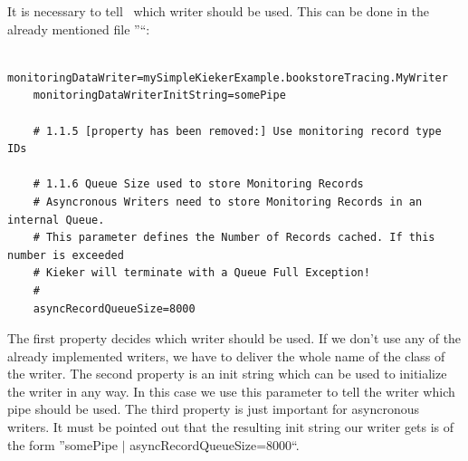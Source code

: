       It is necessary to tell \KiekerMonitoring\ which writer should be used. This can be done in the already mentioned file ''\monitoringPropertiesFile``:
      \setBashListing
      \begin{lstlisting}
	monitoringDataWriter=mySimpleKiekerExample.bookstoreTracing.MyWriter
	monitoringDataWriterInitString=somePipe

	# 1.1.5 [property has been removed:] Use monitoring record type IDs

	# 1.1.6 Queue Size used to store Monitoring Records
	# Asyncronous Writers need to store Monitoring Records in an internal Queue.
	# This parameter defines the Number of Records cached. If this number is exceeded
	# Kieker will terminate with a Queue Full Exception!
	#
	asyncRecordQueueSize=8000
      \end{lstlisting}
      The first property decides which writer should be used. If we don't use any of the already implemented writers, we have to deliver the whole name of the class of the writer. The second property is an init string which can be used to initialize the writer in any way. In this case we use this parameter to tell the writer which pipe should be used. The third property is just important for asyncronous writers. It must be pointed out that the resulting init string our writer gets is of the form ''somePipe $|$ asyncRecordQueueSize=8000``. 